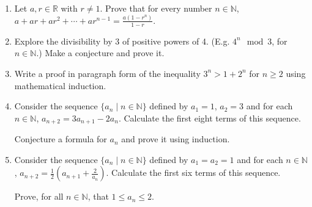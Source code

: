 \documentclass[12pt]{article}
\newcommand{\NN}{{\mathbb N}}  %
\begin{document}
\begin{enumerate}  %



\item Let $a,r\in{\mathbb R}$ with $r\neq 1$.
  Prove that for every number $n\in{\mathbb N}$, $a+ar+ar^2+\dotsb+ar^{n-1}= \frac{a(1-r^n)}{1-r}$.


\item Explore the divisibility by 3 of positive powers of 4.  (E.g. $4^n \mod 3$, for $n\in\NN$.)
        Make a conjecture and prove it.

\item Write a proof in paragraph form of the inequality
$3^n > 1+2^n$  for $n\geq 2$ using mathematical induction.



 \item{} Consider the sequence $\{a_n\mid n\in\NN\}$  defined by $a_1=1$, $a_2=3$ and for each $n\in \NN$,
           $a_{n+2}=3 a_{n+1}-2a_n$.
   Calculate the first eight terms of this sequence. 

   Conjecture a formula for $a_n$ and prove it using induction.

 \item{} Consider the sequence $\{a_n\mid n\in\NN\}$  defined by $a_1=a_2=1$ and for each $n\in \NN$,
           $a_{n+2}=\frac{1}{2}\left(a_{n+1}+\frac{2}{a_n}\right)$.
   Calculate the first six terms of this sequence.

   Prove, for all $n\in\NN$, that $1\leq a_n\leq 2$.


\end{enumerate}
\end{document}
